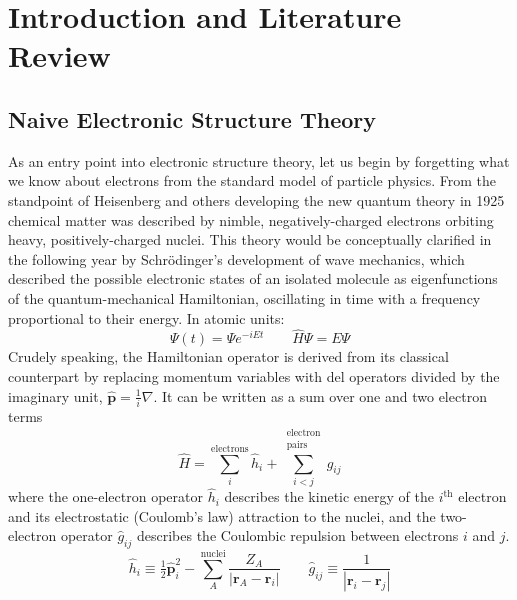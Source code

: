 \chapter[%
    Introduction and Literature Review
]{%
    Introduction and Literature Review
}

\section{Naive Electronic Structure Theory}
\label{sec:introduction:naive-electronic-structure}

As an entry point into electronic structure theory, let us begin by forgetting
what we know about electrons from the standard model of particle physics.
From the standpoint of Heisenberg and others developing the new quantum theory
in 1925\cite{Heisenberg:1925p879} chemical matter was described by nimble,
negatively-charged electrons orbiting heavy, positively-charged nuclei.
This theory would be conceptually clarified in the following year by
Schr\"odinger's development of wave mechanics,
\cite{Schrodinger:1926p361,Schrodinger:1926p489,Schrodinger:1926p734} which
described the possible electronic states of an isolated molecule as
eigenfunctions of the quantum-mechanical Hamiltonian, oscillating in time with a
frequency proportional to their energy.
In atomic units:
\begin{equation}
    \Psi(t)
    =
    \Psi
    e^{-iEt}
    \qquad
    \hat{H}
    \Psi
    =
    E
    \Psi
\end{equation}
Crudely speaking, the Hamiltonian operator is derived from its classical
counterpart by replacing momentum variables with del operators divided by the
imaginary unit,
\(
    \hat{\mathbf{p}}
    =
    \frac{1}{i}
    \nabla
\).
It can be written as a sum over one and two electron terms
\begin{equation}
    \hat{H}
    =
    \sum_i^\text{electrons}
    \hat{h}_i
    +
    \sum_{i<j}^{\substack{\text{electron}\\\text{pairs}}}
    \hat{g}_{ij}
\end{equation}
where the one-electron operator
\(
    \hat{h}_i
\)
describes the kinetic energy of the \(i^\text{th}\) electron and its
electrostatic (Coulomb's law) attraction to the nuclei, and the two-electron
operator
\(
    \hat{g}_{ij}
\)
describes the Coulombic repulsion between electrons \(i\) and \(j\).
\begin{equation}
    \hat{h}_i
    \equiv
    \tfrac{1}{2}
    \hat{\mathbf{p}}_i^2
    -
    \sum_A^\text{nuclei}
    \frac{Z_A}{|\mathbf{r}_A - \mathbf{r}_i|}
    \qquad
    \hat{g}_{ij}
    \equiv
    \frac{1}{|\mathbf{r}_i - \mathbf{r}_j|}
\end{equation}
